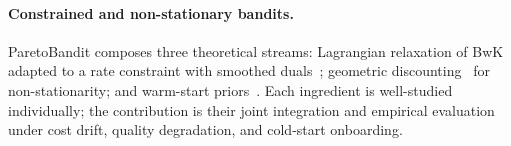 \vspace{-4pt}
\paragraph{Constrained and non-stationary bandits.}
ParetoBandit composes three theoretical streams: Lagrangian relaxation of BwK~\cite{badanidiyuru2013bwk, agrawal2016linear} adapted to a rate constraint with smoothed duals~\cite{balseiro2019learning}; geometric discounting~\cite{garivier2011switching, russac2019weighted} for non-stationarity; and warm-start priors~\cite{oetomo2023warmstart, pan2024cbli}. Each ingredient is well-studied individually; the contribution is their joint integration and empirical evaluation under cost drift, quality degradation, and cold-start onboarding.
\par\endgroup
